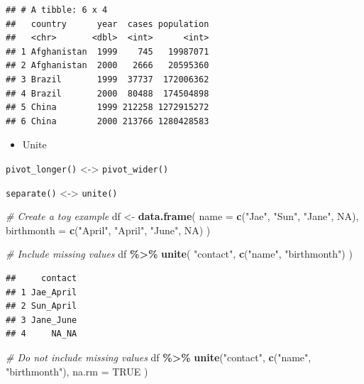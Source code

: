 \documentclass[
]{book}
\newenvironment{Shaded}{\begin{snugshade}}{\end{snugshade}}
\newcommand{\AttributeTok}[1]{\textcolor[rgb]{0.13,0.29,0.53}{#1}}
\newcommand{\CommentTok}[1]{\textcolor[rgb]{0.56,0.35,0.01}{\textit{#1}}}
\newcommand{\ConstantTok}[1]{\textcolor[rgb]{0.56,0.35,0.01}{#1}}
\newcommand{\FunctionTok}[1]{\textcolor[rgb]{0.13,0.29,0.53}{\textbf{#1}}}
\newcommand{\NormalTok}[1]{#1}
\newcommand{\OtherTok}[1]{\textcolor[rgb]{0.56,0.35,0.01}{#1}}
\newcommand{\SpecialCharTok}[1]{\textcolor[rgb]{0.81,0.36,0.00}{\textbf{#1}}}
\newcommand{\StringTok}[1]{\textcolor[rgb]{0.31,0.60,0.02}{#1}}
\providecommand{\tightlist}{%
  \setlength{\itemsep}{0pt}\setlength{\parskip}{0pt}}
\begin{document}
\begin{verbatim}
## # A tibble: 6 x 4
##   country      year  cases population
##   <chr>       <dbl>  <int>      <int>
## 1 Afghanistan  1999    745   19987071
## 2 Afghanistan  2000   2666   20595360
## 3 Brazil       1999  37737  172006362
## 4 Brazil       2000  80488  174504898
## 5 China        1999 212258 1272915272
## 6 China        2000 213766 1280428583
\end{verbatim}

\begin{itemize}
\tightlist
\item
  Unite
\end{itemize}

\texttt{pivot\_longer()} \textless-\textgreater{} \texttt{pivot\_wider()}

\texttt{separate()} \textless-\textgreater{} \texttt{unite()}

\begin{Shaded}
\begin{Highlighting}[]
\CommentTok{\# Create a toy example}
\NormalTok{df }\OtherTok{\textless{}{-}} \FunctionTok{data.frame}\NormalTok{(}
  \AttributeTok{name =} \FunctionTok{c}\NormalTok{(}\StringTok{"Jae"}\NormalTok{, }\StringTok{"Sun"}\NormalTok{, }\StringTok{"Jane"}\NormalTok{, }\ConstantTok{NA}\NormalTok{),}
  \AttributeTok{birthmonth =} \FunctionTok{c}\NormalTok{(}\StringTok{"April"}\NormalTok{, }\StringTok{"April"}\NormalTok{, }\StringTok{"June"}\NormalTok{, }\ConstantTok{NA}\NormalTok{)}
\NormalTok{)}

\CommentTok{\# Include missing values}
\NormalTok{df }\SpecialCharTok{\%\textgreater{}\%} \FunctionTok{unite}\NormalTok{(}
  \StringTok{"contact"}\NormalTok{,}
  \FunctionTok{c}\NormalTok{(}\StringTok{"name"}\NormalTok{, }\StringTok{"birthmonth"}\NormalTok{)}
\NormalTok{)}
\end{Highlighting}
\end{Shaded}

\begin{verbatim}
##     contact
## 1 Jae_April
## 2 Sun_April
## 3 Jane_June
## 4     NA_NA
\end{verbatim}

\begin{Shaded}
\begin{Highlighting}[]
\CommentTok{\# Do not include missing values}
\NormalTok{df }\SpecialCharTok{\%\textgreater{}\%} \FunctionTok{unite}\NormalTok{(}\StringTok{"contact"}\NormalTok{,}
  \FunctionTok{c}\NormalTok{(}\StringTok{"name"}\NormalTok{, }\StringTok{"birthmonth"}\NormalTok{),}
  \AttributeTok{na.rm =} \ConstantTok{TRUE}
\NormalTok{)}
\end{Highlighting}
\end{Shaded}
\end{document}

